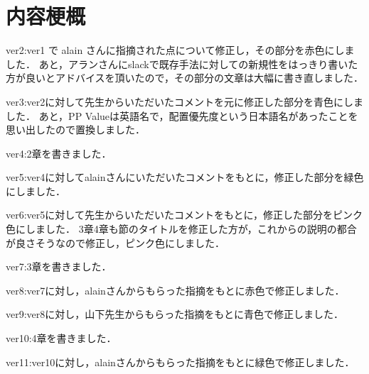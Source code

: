 \chapter*{内容梗概}
ver2:ver1 で alain さんに指摘された点について修正し，その部分を赤色にしました．
あと，アランさんにslackで既存手法に対しての新規性をはっきり書いた方が良いとアドバイスを頂いたので，その部分の文章は大幅に書き直しました．

ver3:ver2に対して先生からいただいたコメントを元に修正した部分を青色にしました．
あと，PP Valueは英語名で，配置優先度という日本語名があったことを思い出したので置換しました．

ver4:2章を書きました．

ver5:ver4に対してalainさんにいただいたコメントをもとに，修正した部分を緑色にしました．

ver6:ver5に対して先生からいただいたコメントをもとに，修正した部分をピンク色にしました．
    3章4章も節のタイトルを修正した方が，これからの説明の都合が良さそうなので修正し，ピンク色にしました．

ver7:3章を書きました．

ver8:ver7に対し，alainさんからもらった指摘をもとに赤色で修正しました．

ver9:ver8に対し，山下先生からもらった指摘をもとに青色で修正しました．

ver10:4章を書きました．

ver11:ver10に対し，alainさんからもらった指摘をもとに緑色で修正しました．
